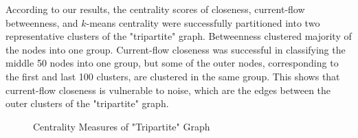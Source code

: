 \documentclass[10pt]{siamltex}
\begin{document}
\begin{pagewiselinenumbers}
According to our results, the centrality scores of closeness, current-flow betweenness, and $k$-means centrality were successfully partitioned into two representative clusters of the "tripartite" graph. Betweenness clustered majority of the nodes into one group. Current-flow closeness was successful in classifying the middle 50 nodes into one group, but some of the outer nodes, corresponding to the first and last 100 clusters, are clustered in the same group. This shows that current-flow closeness is vulnerable to noise, which are the edges between the outer clusters of the "tripartite" graph.
\begin{figure}[h!!]
\centering
{}
\caption{Centrality Measures of "Tripartite" Graph}
\label{fig:centrality2}
\end{figure}


\end{pagewiselinenumbers}
\end{document}

